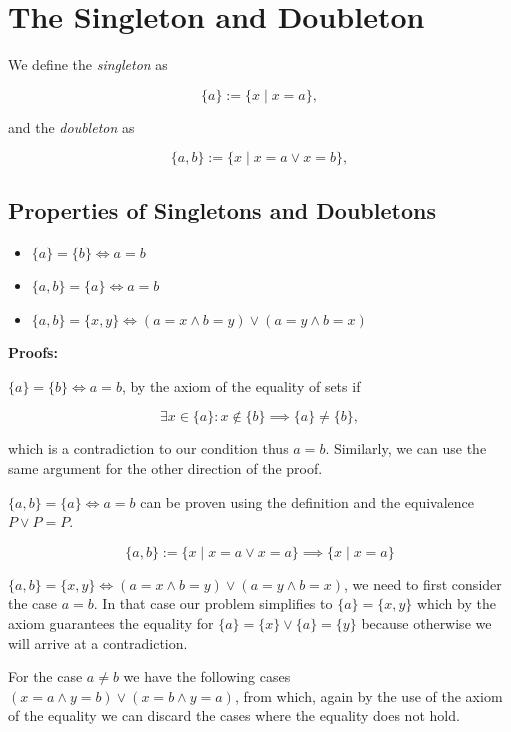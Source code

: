 \section{The Singleton and Doubleton}

We define the \emph{singleton} as

\[
	\{a\} := \{x \mid x = a\},
\]

and the \emph{doubleton} as

\[
	\{a, b\} := \{x \mid x = a \lor x = b\},
\]

\subsection{Properties of Singletons and Doubletons}

\begin{itemize}

	\item \(\{a\} = \{b\} \iff a = b\)

	\item \(\{a, b\} = \{a\} \iff a = b\)

	\item \(\{a, b\} = \{x, y\} \iff (a = x \land b = y) \lor (a = y \land b = x)\)

\end{itemize}

\textbf{Proofs:}

\(\{a\} = \{b\} \iff a = b\), by the axiom of the equality of sets if

\[
	\exists x \in \{a\}: x \notin \{b\} \implies \{a\} \neq \{b\},
\]

which is a contradiction to our condition thus \(a = b\). Similarly, we can use the same argument for the other
direction of the proof.

\QED

\(\{a, b\} = \{a\} \iff a = b\) can be proven using the definition and the equivalence \(P \lor P = P\).

\[
	\{a, b\} := \{x \mid x = a \lor x = a\} \implies \{x \mid x = a\}
\]

\QED

\(\{a, b\} = \{x, y\} \iff (a = x \land b = y) \lor (a = y \land b = x)\), we need to first consider the case \(a = b\). In
that case our problem simplifies to \(\{a\} = \{x, y\}\) which by the axiom guarantees the equality for \(\{a\} = \{x\} \lor \{a\} = \{y\}\)
because otherwise we will arrive at a contradiction.

For the case \(a \neq b\) we have the following cases \((x = a \land y = b) \lor (x = b \land y = a)\), from which, again by the use of the axiom of
the equality we can discard the cases where the equality does not hold.

